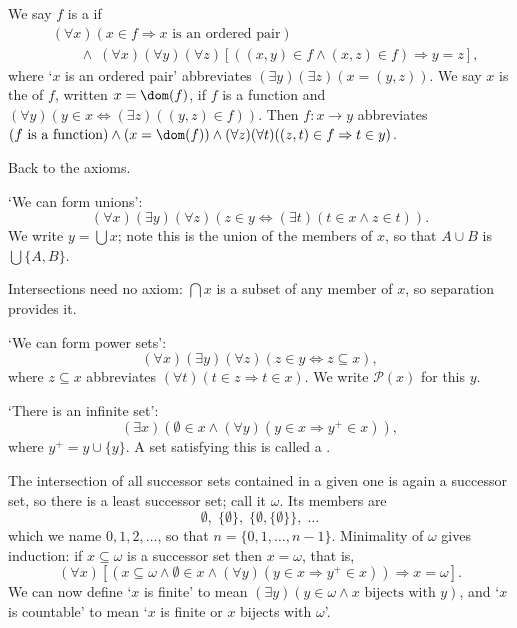 \begin{definition}[Function]
  We say $f$ is a  if
  \begin{align*}
  &(\forall x)(x \in f \Rightarrow x \text{ is an ordered pair}) \\
  &\qquad \land \; (\forall x)(\forall y)(\forall z) [((x, y) \in f\land (x, z) \in f) \Rightarrow y = z],
  \end{align*}
  where `$x$ is an ordered pair' abbreviates $(\exists y)(\exists z)(x = (y,z))$. We say $x$ is the  of $f$, written $x = \dom(f)$, if $f$ is a function and $(\forall y)(y \in x \Leftrightarrow (\exists z)((y, z) \in f))$. Then $f: x \rightarrow y$ abbreviates $(f\text{ is a function}) \land (x = \dom(f)) \land (\forall z)(\forall t)((z, t) \in f \Rightarrow t \in y)$.
\end{definition}

Back to the axioms.

\begin{axiom}[Union]
  `We can form unions':
  $$
(\forall x)(\exists y)(\forall z)(z \in y \Leftrightarrow (\exists t)(t \in x \land z \in t)).
  $$
  We write $y = \bigcup x$; note this is the union of the members of $x$, so that $A \cup B$ is $\bigcup\{A, B\}$.
\end{axiom}

Intersections need no axiom: $\bigcap x$ is a subset of any member of $x$, so separation provides it.

\begin{axiom}
  `We can form power sets':
  $$
  (\forall x)(\exists y)(\forall z)(z \in y \Leftrightarrow z \subseteq x),
  $$
  where $z \subseteq x$ abbreviates $(\forall t)(t \in z \Rightarrow t \in x)$. We write $\mathcal{P}(x)$ for this $y$.
\end{axiom}

\begin{axiom}[Infinity]
`There is an infinite set':
$$
(\exists x)(\emptyset \in x \land (\forall y)(y \in x \Rightarrow y^+ \in x)),
$$
where $y^+ = y \cup \{y\}$. A set satisfying this is called a .
\end{axiom}

The intersection of all successor sets contained in a given one is again a successor set, so there is a least successor set; call it $\omega$. Its members are
$$\emptyset, \; \{\emptyset\}, \; \{\emptyset, \{\emptyset\}\}, \; \dots$$
which we name $0, 1, 2, \dots$, so that $n = \{0, 1, \dots, n-1\}$. Minimality of $\omega$ gives induction: if $x \subseteq \omega$ is a successor set then $x = \omega$, that is,
$$
(\forall x)[(x \subseteq \omega \land \emptyset \in x \land (\forall y)(y \in x \Rightarrow y^+ \in x)) \Rightarrow x = \omega].
$$
We can now define `$x$ is finite' to mean $(\exists y)(y \in \omega \land x \text{ bijects with } y)$, and `$x$ is countable' to mean `$x$ is finite or $x$ bijects with $\omega$'.

